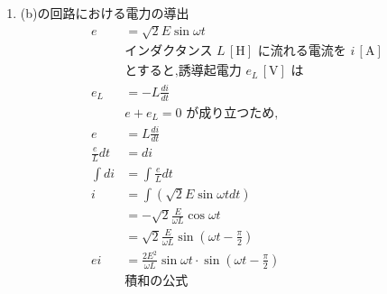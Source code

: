 \documentclass[twocolumn]{article}
\begin{document}
\begin{enumerate}
  \item (b)の回路における電力の導出
        \begin{align*}
          e              & = \sqrt{2}E \sin \omega t                                                                                               \\
                         & \text{インダクタンス } L\,[\text{H}] \text{ に流れる電流を } i\,[\text{A}]                                                            \\
                         & \text{とすると,誘導起電力 } e_L\,[\text{V}] \text{ は}                                                                            \\
          e_L            & = -L \frac{di}{dt}                                                                                                      \\
                         & e + e_L = 0 \text{ が成り立つため,}                                                                                            \\
          e              & = L \frac{di}{dt}                                                                                                       \\
          \frac{e}{L} dt & = di                                                                                                                    \\
          \int di        & = \int \frac{e}{L} dt                                                                                                   \\
          i              & = \int \left(\sqrt{2} E \sin \omega t dt\right)                                                                         \\
                         & = - \sqrt{2} \frac{E}{\omega L} \cos \omega t                                                                           \\
                         & = \sqrt{2}\frac{E}{\omega L}\sin \left(\omega t - \frac{\pi}{2}\right)                                                  \\
          ei             & = \frac{2E^2}{\omega L}\sin \omega t \cdot \sin \left(\omega t - \frac{\pi}{2}\right)                                   \\
                         & \text{積和の公式}                                                                                                            \\

\end{align*}
\end{enumerate}
\end{document}
